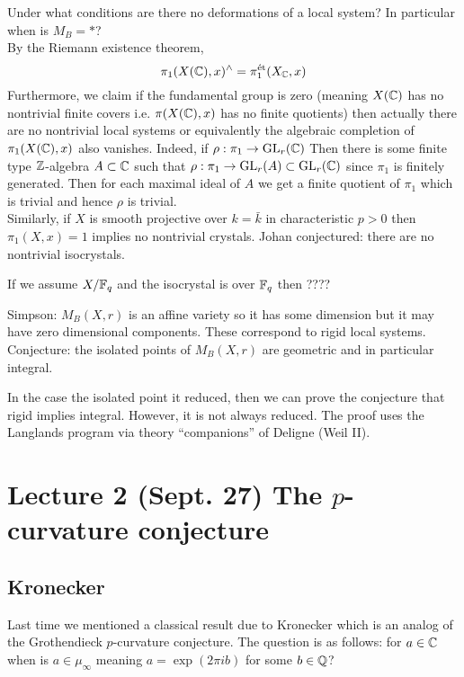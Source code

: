 \documentclass[12pt]{article}
\begin{document}
Under what conditions are there no deformations of a local system? In particular when is $M_B = *$? 
\bigskip\\
By the Riemann existence theorem, 
\[ \pi_1(X(\mathbb{C}), x)^{\wedge} = \pi_1^{\text{\'{e}t}}(X_{\mathbb{C}}, x) \]
Furthermore, we claim if the \etale fundamental group is zero (meaning $X(\mathbb{C})$ has no nontrivial finite covers i.e. $\pi(X(\mathbb{C}), x)$ has no finite quotients) then actually there are no nontrivial local systems or equivalently the algebraic completion of $\pi_1(X(\mathbb{C}), x)$ also vanishes. Indeed, if $\rho : \pi_1 \to \mathrm{GL}_r(\mathbb{C})$ Then there is some finite type $\mathbb{Z}$-algebra $A \subset \mathbb{C}$ such that $\rho : \pi_1 \to \mathrm{GL}_r(A) \subset \mathrm{GL}_r(\mathbb{C})$ since $\pi_1$ is finitely generated. Then for each maximal ideal of $A$ we get a finite quotient of $\pi_1$ which is trivial and hence $\rho$ is trivial. 
\bigskip\\
Similarly, if $X$ is smooth projective over $k = \bar{k}$ in characteristic $p > 0$ then $\pi_1(X, x) = 1$ implies no nontrivial crystals. Johan conjectured: there are no nontrivial isocrystals. 

\begin{rmk}
If we assume $X / \mathbb{F}_q$ and the isocrystal is over $\mathbb{F}_q$ then ????
\end{rmk}  

Simpson: $M_B(X, r)$ is an affine variety so it has some dimension but it may have zero dimensional components. These correspond to rigid local systems. Conjecture: the isolated points of $M_B(X, r)$ are geometric and in particular integral. 


In the case the isolated point it reduced, then we can prove the conjecture that rigid implies integral. However, it is not always reduced. The proof uses the Langlands program via theory ``companions'' of Deligne (Weil II). 


\section{Lecture 2 (Sept. 27) The $p$-curvature conjecture}

\subsection{Kronecker}

Last time we mentioned a classical result due to Kronecker which is an analog of the Grothendieck $p$-curvature conjecture. The question is as follows: for $a \in \mathbb{C}$ when is $a \in \mu_{\infty}$ meaning $a = \exp(2 \pi i b)$ for some $b \in \mathbb{Q}$?
\end{document}
